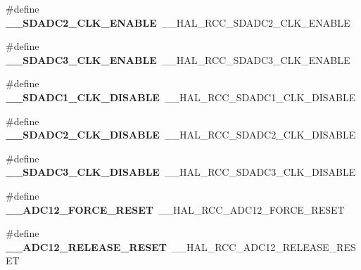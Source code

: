 \begin{DoxyCompactItemize}
\item 
\mbox{\label{group___h_a_l___r_c_c___aliased_ga16ecec4c60d069b7d6c99aefc8956d79}} 
\#define {\bfseries \+\_\+\+\_\+\+S\+D\+A\+D\+C2\+\_\+\+C\+L\+K\+\_\+\+E\+N\+A\+B\+LE}~\+\_\+\+\_\+\+H\+A\+L\+\_\+\+R\+C\+C\+\_\+\+S\+D\+A\+D\+C2\+\_\+\+C\+L\+K\+\_\+\+E\+N\+A\+B\+LE
\item 
\mbox{\label{group___h_a_l___r_c_c___aliased_ga50aefed27799abc72d6b30099a764208}} 
\#define {\bfseries \+\_\+\+\_\+\+S\+D\+A\+D\+C3\+\_\+\+C\+L\+K\+\_\+\+E\+N\+A\+B\+LE}~\+\_\+\+\_\+\+H\+A\+L\+\_\+\+R\+C\+C\+\_\+\+S\+D\+A\+D\+C3\+\_\+\+C\+L\+K\+\_\+\+E\+N\+A\+B\+LE
\item 
\mbox{\label{group___h_a_l___r_c_c___aliased_ga7bee6f236c8a299f3b751b46612348a5}} 
\#define {\bfseries \+\_\+\+\_\+\+S\+D\+A\+D\+C1\+\_\+\+C\+L\+K\+\_\+\+D\+I\+S\+A\+B\+LE}~\+\_\+\+\_\+\+H\+A\+L\+\_\+\+R\+C\+C\+\_\+\+S\+D\+A\+D\+C1\+\_\+\+C\+L\+K\+\_\+\+D\+I\+S\+A\+B\+LE
\item 
\mbox{\label{group___h_a_l___r_c_c___aliased_ga99088247c1f6d91fbc4423f589139445}} 
\#define {\bfseries \+\_\+\+\_\+\+S\+D\+A\+D\+C2\+\_\+\+C\+L\+K\+\_\+\+D\+I\+S\+A\+B\+LE}~\+\_\+\+\_\+\+H\+A\+L\+\_\+\+R\+C\+C\+\_\+\+S\+D\+A\+D\+C2\+\_\+\+C\+L\+K\+\_\+\+D\+I\+S\+A\+B\+LE
\item 
\mbox{\label{group___h_a_l___r_c_c___aliased_ga42ec4cf1c87cbddc3b2298baedddba7b}} 
\#define {\bfseries \+\_\+\+\_\+\+S\+D\+A\+D\+C3\+\_\+\+C\+L\+K\+\_\+\+D\+I\+S\+A\+B\+LE}~\+\_\+\+\_\+\+H\+A\+L\+\_\+\+R\+C\+C\+\_\+\+S\+D\+A\+D\+C3\+\_\+\+C\+L\+K\+\_\+\+D\+I\+S\+A\+B\+LE
\item 
\mbox{\label{group___h_a_l___r_c_c___aliased_gacbc2844f7655815ba4ae65f4ca715dbb}} 
\#define {\bfseries \+\_\+\+\_\+\+A\+D\+C12\+\_\+\+F\+O\+R\+C\+E\+\_\+\+R\+E\+S\+ET}~\+\_\+\+\_\+\+H\+A\+L\+\_\+\+R\+C\+C\+\_\+\+A\+D\+C12\+\_\+\+F\+O\+R\+C\+E\+\_\+\+R\+E\+S\+ET
\item 
\mbox{\label{group___h_a_l___r_c_c___aliased_gaccd3e06d5b914cebaaacbc94d05c7660}} 
\#define {\bfseries \+\_\+\+\_\+\+A\+D\+C12\+\_\+\+R\+E\+L\+E\+A\+S\+E\+\_\+\+R\+E\+S\+ET}~\+\_\+\+\_\+\+H\+A\+L\+\_\+\+R\+C\+C\+\_\+\+A\+D\+C12\+\_\+\+R\+E\+L\+E\+A\+S\+E\+\_\+\+R\+E\+S\+ET

\end{DoxyCompactItemize}
